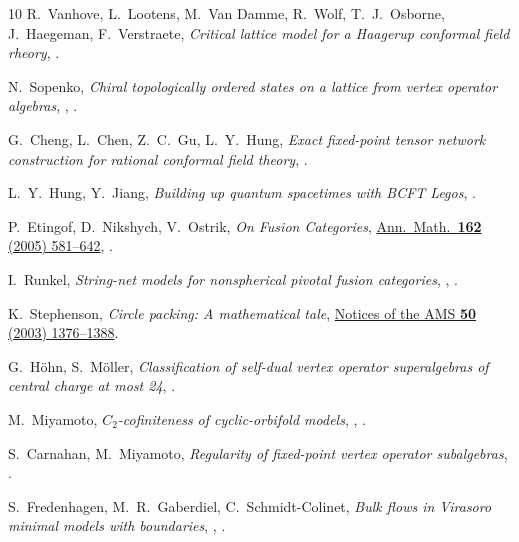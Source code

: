 \documentclass[11pt,a4paper]{article}
\numberwithin{equation}{section}
\begin{document}
\begin{thebibliography}{10}
R.~Vanhove, L.~Lootens, M.~Van Damme, R.~Wolf, T.~J.~Osborne, J.~Haegeman, F.~Verstraete,
\textit{Critical lattice model for a Haagerup conformal field rheory},
.

N.~Sopenko,
\textit{Chiral topologically ordered states on a lattice from vertex operator algebras},
,
.

G.~Cheng, L.~Chen, Z.~C.~Gu, L.~Y.~Hung,
{\it Exact fixed-point tensor network construction for rational conformal field theory},
.

L.~Y.~Hung, Y.~Jiang,
\textit{Building up quantum spacetimes with BCFT Legos},
.

P.~Etingof, D.~Nikshych, V.~Ostrik, 
{\it On Fusion Categories}, 
\href{https://www.jstor.org/stable/20159926}{Ann.\ Math.\ {\bf 162} (2005) 581--642},
.

I.~Runkel,
\textit{String-net models for nonspherical pivotal fusion categories},
,
.

K.~Stephenson,
\textit{Circle packing: A mathematical tale},
\href{https://www.ams.org/cgi-bin/notices/nxgnotices.pl?fm=main&current=200311}{Notices of the AMS \textbf{50} (2003) 1376--1388}. 

G.~H\"ohn, S.~M\"oller,
\textit{Classification of self-dual vertex operator superalgebras of central charge at most 24},
.

M.~Miyamoto,
\textit{$C_2$-cofiniteness of cyclic-orbifold models},
,
.

S.~Carnahan, M.~Miyamoto,
\textit{Regularity of fixed-point vertex operator subalgebras},
.

S.~Fredenhagen, M.~R.~Gaberdiel, C.~Schmidt-Colinet,
{\it Bulk flows in Virasoro minimal models with boundaries},
,
.


\end{thebibliography}
\end{document}
